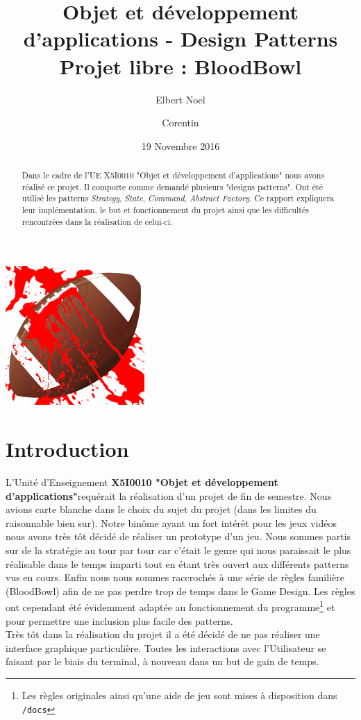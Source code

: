 \documentclass{article}
\title{Objet et développement d'applications - Design Patterns\\
Projet libre : BloodBowl}
\author{Elbert Noel \bsc{NYUNTING} \and Corentin \bsc{CHÉDOTAL}}
\date{19 Novembre 2016}
\newcommand{\info}{\texttt}
\newcommand{\pattern}{\emph}
\newcommand{\ue}{\textbf{X5I0010 "Objet et développement d'applications"}}
\begin{document}
\maketitle

\centerline{\includegraphics[scale=0.75]{img/logo.png}}

\begin{abstract}
    Dans le cadre de l'UE X5I0010 "Objet et développement d'applications" nous avons réalisé ce projet. Il comporte comme demandé plusieurs "designs patterns". Ont été utilisé les patterns \pattern{Strategy}, \pattern{State}, \pattern{Command}, \pattern{Abstract Factory}. Ce rapport expliquera leur implémentation, le but et fonctionnement du projet ainsi que les difficultés rencontrées dans la réalisation de celui-ci.
\end{abstract}

\newpage

\tableofcontents

\newpage

\section{Introduction}
    
    L'Unité d'Enseignement \ue requérait la réalisation d'un projet de fin de semestre. Nous avions carte blanche dans le choix du sujet du projet (dans les limites du raisonnable bien sur). Notre binôme ayant un fort intérêt pour les jeux vidéos nous avons très tôt décidé de réaliser un prototype d'un jeu. Nous sommes partis sur de la stratégie au tour par tour car c'était le genre qui nous paraissait le plus réalisable dans le temps imparti tout en étant très ouvert aux différents patterns vus en cours. Enfin nous nous sommes raccrochés à une série de règles familière (BloodBowl) afin de ne pas perdre trop de temps dans le Game Design. Les règles ont cependant été évidemment adaptée au fonctionnement du programme\footnote{Les règles originales ainsi qu'une aide de jeu sont mises à disposition dans \info{/docs}} et pour permettre une inclusion plus facile des patterns.\\
    Très tôt dans la réalisation du projet il a été décidé de ne pas réaliser une interface graphique particulière. Toutes les interactions avec l'Utilisateur se faisant par le biais du terminal, à nouveau dans un but de gain de temps.
\end{document}
